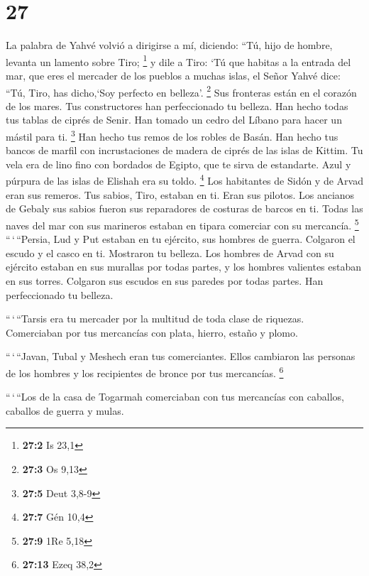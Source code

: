 \hypertarget{section-26}{%
\section{27}\label{section-26}}

 La palabra de Yahvé volvió a dirigirse a mí, diciendo:
 ``Tú, hijo de hombre, levanta un lamento sobre Tiro;
\footnote{\textbf{27:2} Is 23,1}  y dile a Tiro: `Tú que
habitas a la entrada del mar, que eres el mercader de los pueblos a
muchas islas, el Señor Yahvé dice: ``Tú, Tiro, has dicho,`Soy perfecto
en belleza'. \footnote{\textbf{27:3} Os 9,13}  Sus
fronteras están en el corazón de los mares. Tus constructores han
perfeccionado tu belleza.  Han hecho todas tus tablas de
ciprés de Senir. Han tomado un cedro del Líbano para hacer un mástil
para ti. \footnote{\textbf{27:5} Deut 3,8-9}  Han hecho
tus remos de los robles de Basán. Han hecho tus bancos de marfil con
incrustaciones de madera de ciprés de las islas de Kittim.
 Tu vela era de lino fino con bordados de Egipto, que te
sirva de estandarte. Azul y púrpura de las islas de Elishah era su
toldo. \footnote{\textbf{27:7} Gén 10,4}  Los habitantes
de Sidón y de Arvad eran sus remeros. Tus sabios, Tiro, estaban en ti.
Eran sus pilotos.  Los ancianos de Gebaly sus sabios
fueron sus reparadores de costuras de barcos en ti. Todas las naves del
mar con sus marineros estaban en tipara comerciar con su mercancía.
\footnote{\textbf{27:9} 1Re 5,18}  ``\,`\,``Persia, Lud y
Put estaban en tu ejército, sus hombres de guerra. Colgaron el escudo y
el casco en ti. Mostraron tu belleza.  Los hombres de
Arvad con su ejército estaban en sus murallas por todas partes, y los
hombres valientes estaban en sus torres. Colgaron sus escudos en sus
paredes por todas partes. Han perfeccionado tu belleza.

 ``\,`\,``Tarsis era tu mercader por la multitud de toda
clase de riquezas. Comerciaban por tus mercancías con plata, hierro,
estaño y plomo.

 ``\,`\,``Javan, Tubal y Meshech eran tus comerciantes.
Ellos cambiaron las personas de los hombres y los recipientes de bronce
por tus mercancías. \footnote{\textbf{27:13} Ezeq 38,2}

 ``\,`\,``Los de la casa de Togarmah comerciaban con tus
mercancías con caballos, caballos de guerra y mulas.

